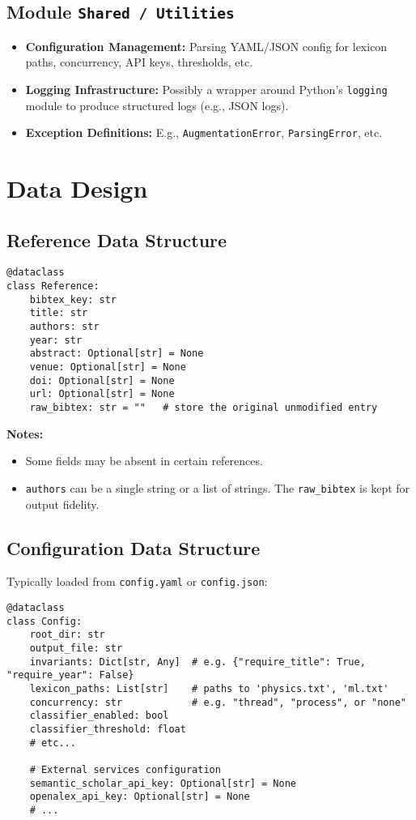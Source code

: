 \documentclass[12pt]{article}
\begin{document}
\subsection{Module \texttt{Shared / Utilities}}
\begin{itemize}
  \item \textbf{Configuration Management:} Parsing YAML/JSON config for lexicon paths, concurrency, API keys, thresholds, etc.
  \item \textbf{Logging Infrastructure:} Possibly a wrapper around Python’s \texttt{logging} module to produce structured logs (e.g., JSON logs).
  \item \textbf{Exception Definitions:} E.g., \texttt{AugmentationError}, \texttt{ParsingError}, etc.
\end{itemize}

\section{Data Design}

\subsection{Reference Data Structure}
\begin{verbatim}
@dataclass
class Reference:
    bibtex_key: str
    title: str
    authors: str
    year: str
    abstract: Optional[str] = None
    venue: Optional[str] = None
    doi: Optional[str] = None
    url: Optional[str] = None
    raw_bibtex: str = ""   # store the original unmodified entry
\end{verbatim}

\textbf{Notes:}
\begin{itemize}
  \item Some fields may be absent in certain references. 
  \item \texttt{authors} can be a single string or a list of strings. The \texttt{raw\_bibtex} is kept for output fidelity.
\end{itemize}

\subsection{Configuration Data Structure}
Typically loaded from \texttt{config.yaml} or \texttt{config.json}:
\begin{verbatim}
@dataclass
class Config:
    root_dir: str
    output_file: str
    invariants: Dict[str, Any]  # e.g. {"require_title": True, "require_year": False}
    lexicon_paths: List[str]    # paths to 'physics.txt', 'ml.txt'
    concurrency: str            # e.g. "thread", "process", or "none"
    classifier_enabled: bool
    classifier_threshold: float
    # etc...

    # External services configuration
    semantic_scholar_api_key: Optional[str] = None
    openalex_api_key: Optional[str] = None
    # ...
\end{verbatim}
\end{document}
